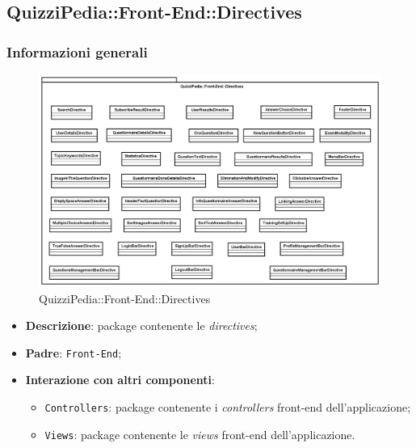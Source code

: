 \newpage

\subsection{QuizziPedia::Front-End::Directives}
\subsubsection{Informazioni generali}
\label{QuizziPedia::Front-End::Directives}
\begin{figure} [ht]
	\centering
	\includegraphics[scale=0.35]{UML/Package/QuizziPedia_Front-End_Directives.png}
	\caption{QuizziPedia::Front-End::Directives}
\end{figure}
\begin{itemize}
	\item \textbf{Descrizione}: package contenente le \textit{directives};
	\item \textbf{Padre}: \texttt{Front-End};
	\item \textbf{Interazione con altri componenti}:
	\begin{itemize}
		\item \texttt{Controllers}: package contenente i \textit{controllers} front-end dell'applicazione;
		\item \texttt{Views}: package contenente le \textit{views} front-end dell'applicazione.
	\end{itemize}
\end{itemize}
